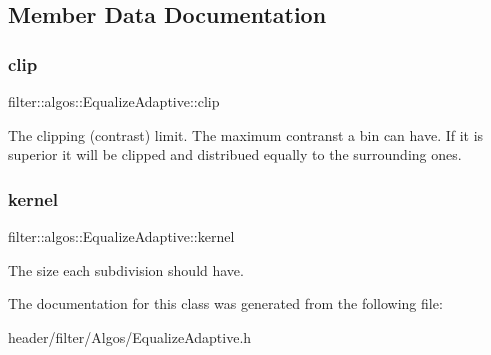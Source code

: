 \subsection{Member Data Documentation}
\mbox{\label{classfilter_1_1algos_1_1_equalize_adaptive_a46afdee63800444f373e4eae9fc9cc3a}} 
\subsubsection{\texorpdfstring{clip}{clip}}
{\footnotesize\ttfamily filter\+::algos\+::\+Equalize\+Adaptive\+::clip}

The clipping (contrast) limit. The maximum contranst a bin can have. If it is superior it will be clipped and distribued equally to the surrounding ones. \mbox{\label{classfilter_1_1algos_1_1_equalize_adaptive_ae190d8c8f0cb57cd1a2fb2fc778c963a}} 
\subsubsection{\texorpdfstring{kernel}{kernel}}
{\footnotesize\ttfamily filter\+::algos\+::\+Equalize\+Adaptive\+::kernel}

The size each subdivision should have. 

The documentation for this class was generated from the following file\+:\begin{DoxyCompactItemize}
\item 
header/filter/\+Algos/Equalize\+Adaptive.\+h\end{DoxyCompactItemize}

